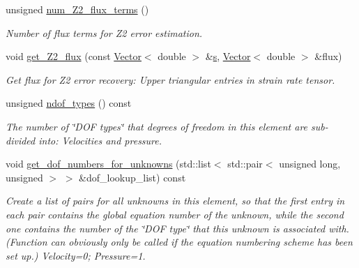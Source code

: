 \begin{DoxyCompactItemize}
unsigned \hyperlink{classoomph_1_1GeneralisedNewtonianAxisymmetricTTaylorHoodElement_ad607e2e88bfcab444870e8d6b4e4b08a}{num\+\_\+\+Z2\+\_\+flux\+\_\+terms} ()
\begin{DoxyCompactList}\small\item\em Number of \textquotesingle{}flux\textquotesingle{} terms for Z2 error estimation. \end{DoxyCompactList}\item 
void \hyperlink{classoomph_1_1GeneralisedNewtonianAxisymmetricTTaylorHoodElement_ae82615d8eb1595a83abceddf43366dbf}{get\+\_\+\+Z2\+\_\+flux} (const \hyperlink{classoomph_1_1Vector}{Vector}$<$ double $>$ \&\hyperlink{cfortran_8h_ab7123126e4885ef647dd9c6e3807a21c}{s}, \hyperlink{classoomph_1_1Vector}{Vector}$<$ double $>$ \&flux)
\begin{DoxyCompactList}\small\item\em Get \textquotesingle{}flux\textquotesingle{} for Z2 error recovery\+: Upper triangular entries in strain rate tensor. \end{DoxyCompactList}\item 
unsigned \hyperlink{classoomph_1_1GeneralisedNewtonianAxisymmetricTTaylorHoodElement_ab5b87110b4a1c13ab828c259a28d2d36}{ndof\+\_\+types} () const
\begin{DoxyCompactList}\small\item\em The number of \char`\"{}\+D\+O\+F types\char`\"{} that degrees of freedom in this element are sub-\/divided into\+: Velocities and pressure. \end{DoxyCompactList}\item 
void \hyperlink{classoomph_1_1GeneralisedNewtonianAxisymmetricTTaylorHoodElement_adf21b3fd505b34cc8546f97499b3a55e}{get\+\_\+dof\+\_\+numbers\+\_\+for\+\_\+unknowns} (std\+::list$<$ std\+::pair$<$ unsigned long, unsigned $>$ $>$ \&dof\+\_\+lookup\+\_\+list) const
\begin{DoxyCompactList}\small\item\em Create a list of pairs for all unknowns in this element, so that the first entry in each pair contains the global equation number of the unknown, while the second one contains the number of the \char`\"{}\+D\+O\+F type\char`\"{} that this unknown is associated with. (Function can obviously only be called if the equation numbering scheme has been set up.) Velocity=0; Pressure=1. \end{DoxyCompactList}\end{DoxyCompactItemize}
